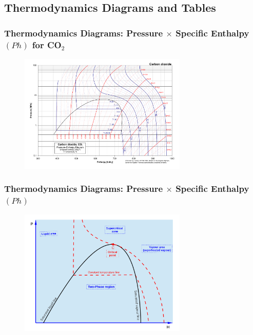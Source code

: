 \documentclass[10pt,compress,handout,ignorenonframetext]{beamer}
\begin{document}
\subsection{Thermodynamics Diagrams and Tables}

\begin{frame}
 \frametitle{Thermodynamics Diagrams: Pressure $\times$ Specific Enthalpy $(Ph)$ for CO$_{2}$}
  \begin{center}
   \begin{figure}
     \includegraphics[width=8cm,height=7.cm,clip]{./Pics/CO2col}
   \end{figure}
   \end{center}
\end{frame}

\begin{frame}
 \frametitle{Thermodynamics Diagrams: Pressure $\times$ Specific Enthalpy $(Ph)$}
  \begin{center}
   \begin{figure}
      \includegraphics[width=8cm,height=7.cm,clip]{./Pics/Overview_Refrig18}
   \end{figure}
   \end{center}
\end{frame}
\end{document}
